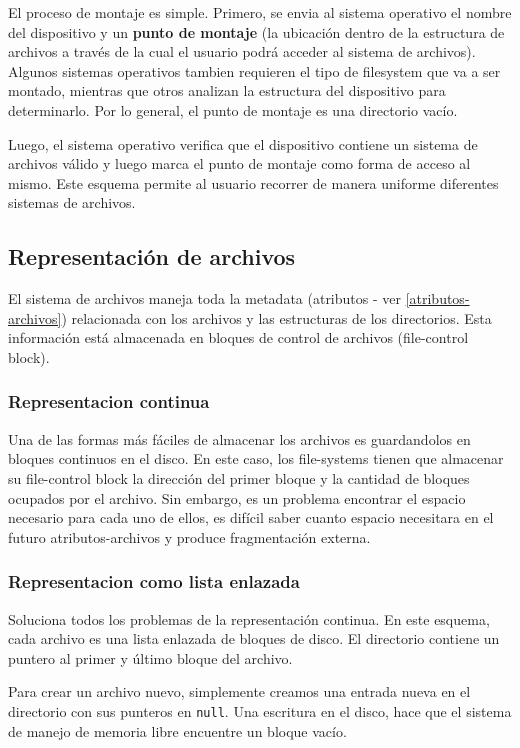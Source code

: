 El proceso de montaje es simple. Primero, se envia al sistema operativo el nombre del dispositivo y un \textbf{punto de montaje} (la ubicación dentro de la estructura de archivos a través de la cual el usuario podrá acceder al sistema de archivos). Algunos sistemas operativos tambien requieren el tipo de filesystem que va a ser montado, mientras que otros analizan la estructura del dispositivo para determinarlo. Por lo general, el punto de montaje es una directorio vacío.

Luego, el sistema operativo verifica que el dispositivo contiene un sistema de archivos válido y luego marca el punto de montaje como forma de acceso al mismo. Este esquema permite al usuario recorrer de manera uniforme diferentes sistemas de archivos.

\subsection{Representación de archivos}
El sistema de archivos maneja toda la metadata (atributos - ver \ref{atributos-archivos}) relacionada con los archivos y las estructuras de los directorios. Esta información está almacenada en bloques de control de archivos (file-control block).

\subsubsection{Representacion continua}
Una de las formas más fáciles de almacenar los archivos es guardandolos en bloques continuos en el disco. En este caso, los file-systems tienen que almacenar su file-control block la dirección del primer bloque y la cantidad de bloques ocupados por el archivo. Sin embargo, es un problema encontrar el espacio necesario para cada uno de ellos, es difícil saber cuanto espacio necesitara en el futuro atributos-archivos y produce fragmentación externa.

\subsubsection{Representacion como lista enlazada}
Soluciona todos los problemas de la representación continua. En este esquema, cada archivo es una lista enlazada de bloques de disco. El directorio contiene un puntero al primer y último bloque del archivo.

Para crear un archivo nuevo, simplemente creamos una entrada nueva en el directorio con sus punteros en \texttt{null}. Una escritura en el disco, hace que el sistema de manejo de memoria libre encuentre un bloque vacío.

